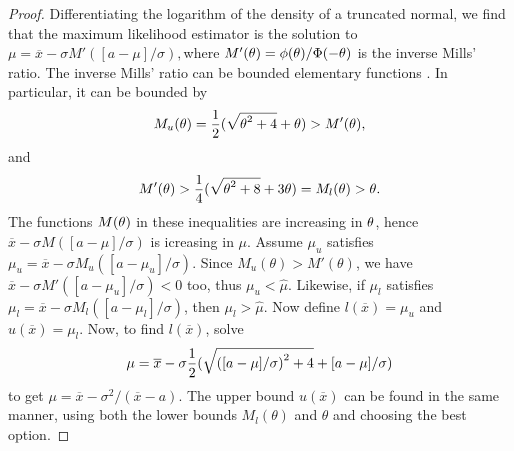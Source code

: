 \begin{proof}
Differentiating the logarithm of the density of a truncated normal,
we find that the maximum likelihood estimator is the solution to $\mu=\overline{x}-\sigma M'([a-\mu]/\sigma),$where
$M'(\text{\ensuremath{\theta}})=\phi(\text{\ensuremath{\theta}})/\Phi(-\text{\ensuremath{\theta}})$
is the inverse Mills' ratio. The inverse Mills' ratio can be bounded
elementary functions \parencite{Yang2015-pa}. In particular, it can be
bounded by \parencite[Equation 32]{Gasull2014-hn}
\begin{equation}
M_{u}(\theta)=\frac{1}{2}(\sqrt{\text{\ensuremath{\theta}}^{2}+4}+\text{\ensuremath{\theta}})>M'(\text{\ensuremath{\theta}}),\label{eq:Mills' ratio inequality}
\end{equation}
and 
\begin{equation}
M'(\text{\ensuremath{\theta}})>\frac{1}{4}(\sqrt{\text{\ensuremath{\theta}}^{2}+8}+3\text{\ensuremath{\theta}})=M_{l}(\theta)>\theta.\label{eq:Mill's ratio inequality (2)}
\end{equation}
The functions $M(\text{\ensuremath{\theta}})$ in these inequalities
are increasing in $\text{\ensuremath{\theta}}$, hence $\overline{x}-\sigma M([a-\mu]/\sigma)$
is icreasing in $\mu$. Assume $\mu_{u}$ satisfies $\mu_{u}=\overline{x}-\sigma M_{u}([a-\mu_{u}]/\sigma)$.
Since $M_{u}(\theta)>M'(\theta)$, we have $\overline{x}-\sigma M'([a-\mu_{u}]/\sigma)<0$
too, thus $\mu_{u}<\hat{\mu}$. Likewise, if $\mu_{l}$ satisfies
$\mu_{l}=\overline{x}-\sigma M_{l}([a-\mu_{l}]/\sigma)$, then $\mu_{l}>\hat{\mu}$.
Now define $l(\overline{x})=\mu_{u}$ and $u(\overline{x})=\mu_{l}$.
Now, to find $l(\overline{x})$, solve
\[
\mu=\overline{x}-\sigma\frac{1}{2}(\sqrt{\text{\ensuremath{([a-\mu]/\sigma)}}^{2}+4}+\text{\ensuremath{[a-\mu]/\sigma}})
\]
to get $\mu=\overline{x}-\sigma^{2}/(\overline{x}-a)$. The upper
bound $u(\overline{x})$ can be found in the same manner, using both
the lower bounds $M_{l}(\theta)$ and $\theta$ and choosing the best
option.
\end{proof}